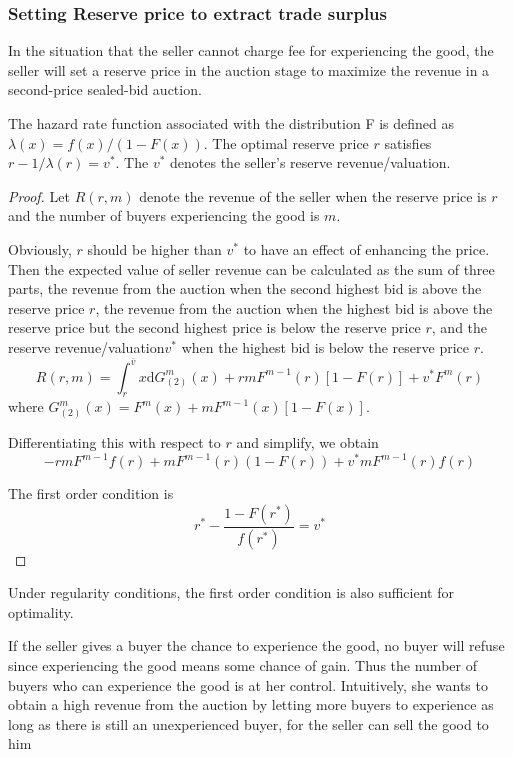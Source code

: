 \subsubsection{Setting Reserve price to extract trade surplus}
In the situation that the seller cannot charge fee for experiencing the good, 
the seller will set a reserve price in the auction stage to maximize the
revenue in a second-price sealed-bid auction. 
\begin{lemma}\label{lem}
 The hazard rate function associated with the distribution F is
defined as $\lambda(x) = f(x) / (1 - F(x))$. The optimal reserve price $r$ satisfies $r - 1/\lambda(r)= v^*$. The $v^*$ denotes the seller's reserve revenue/valuation. 
\end{lemma}
\begin{proof}
Let $R(r, m)$ denote the revenue of the seller when the reserve price is $r$ and the number of buyers experiencing the good is $m$. 

Obviously, $r$ should be higher than $v^*$ to have an effect of enhancing the price. 
Then the expected value of seller revenue can be calculated as the sum of three parts, the revenue from the auction when the second highest bid is above the reserve price $r$, the revenue from the auction when the highest bid is above the reserve price but the second highest price is below the reserve price $r$, and the reserve revenue/valuation$v^*$ when the highest bid is below the reserve price $r$. 
\begin{equation}\label{equ}
R(r , m) =\int_{r}^{\overline{v}}x\mathrm{d}G_{(2)}^{m}(x) + rmF^{m-1}(r)[1 - F(r)] + v^* F^{m}(r)
\end{equation}
where $G_{(2)}^{m}(x) = F^{m}(x) + mF^{m-1}(x)[1 - F(x)]$. 


Differentiating this with respect to $r$ and simplify, we obtain
$$-rmF^{m-1}f(r)+mF^{m-1}(r)(1-F(r))+v^* mF^{m-1}(r)f(r)$$

The first order condition is 
$$r^* - \frac{1 - F(r^*)}{f(r^*)} = v^*$$
\end{proof}
\begin{remark}
 Under regularity conditions, the first order condition is also sufficient for optimality. 
\end{remark}
 If the seller gives a buyer the chance to experience the good, no buyer will refuse since experiencing the good means some chance
of gain. Thus the number of buyers who can experience the good is at her control. Intuitively, she 
wants to obtain a high revenue from the auction by letting more buyers to experience as long as there is still an unexperienced buyer, for the seller can sell the good to him
